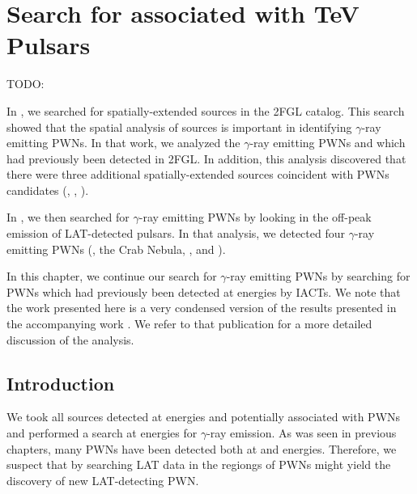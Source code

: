 \chapter{Search for  associated with TeV Pulsars}


TODO:

In , we searched for spatially-extended sources
in the 2FGL catalog.  This search showed that the spatial analysis of
\fermi sources is important in identifying $\gamma$-ray emitting \acp{PWN}.
In that work, we analyzed the $\gamma$-ray emitting \acp{PWN} 
and \mshfifteenfiftytwo which had previously been detected in \ac{2FGL}.
In addition, this analysis discovered that there were three additional
spatially-extended \fermi sources coincident with \acp{PWN} candidates
(, , ).

In , we then searched for $\gamma$-ray emitting \acp{PWN}
by looking in the off-peak emission of \ac{LAT}-detected
pulsars. In that analysis, we detected four $\gamma$-ray emitting \acp{PWN}
(\velax, the Crab Nebula, \mshfifteenfiftytwo, and \threecfiftyeight).

In this chapter, we continue our search for $\gamma$-ray emitting
\acp{PWN} by searching for \acp{PWN} which had previously been detected
at \tev energies by \acp{IACT}. We note that the work presented here is a
very condensed version of the results presented in the accompanying work
\citep{acero_2013a_constraints-galactic}.  We refer to that publication
for a more detailed discussion of the analysis.

\section{Introduction}

We took all sources detected at \tev energies and potentially associated
with \acp{PWN} and performed a search at \gev energies for $\gamma$-ray
emission. As was seen in previous chapters, many \acp{PWN} have been
detected both at \gev and \tev energies. Therefore, we suspect that by
searching \ac{LAT} data in the regiongs of \tev \acp{PWN} might yield
the discovery of new LAT-detecting \ac{PWN}.

